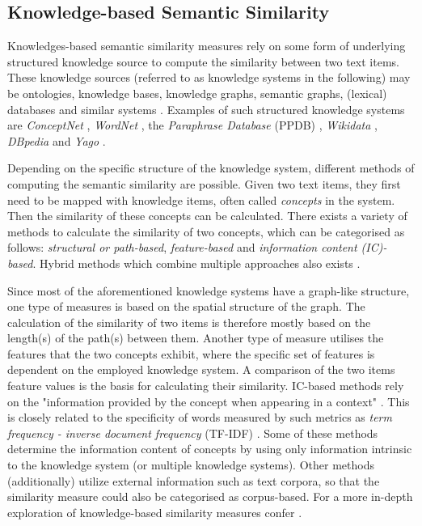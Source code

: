 \documentclass[11pt]{scrreprt}
\let\citef\cite  %
\let\cite\parencite  %
\begin{document}
\subsection{Knowledge-based Semantic Similarity}
Knowledges-based semantic similarity measures rely on some form of underlying structured knowledge source to compute the similarity between two text items. These knowledge sources (referred to as knowledge systems in the following) may be ontologies, knowledge bases, knowledge graphs, semantic graphs, (lexical) databases and similar systems \cite{chandrasekaranEvolutionSemanticSimilarity2021, harispeSemanticSimilarityNatural2015}. Examples of such structured knowledge systems are \textit{ConceptNet} \cite{speerConceptNetOpenMultilingual2017}, \textit{WordNet} \cite{millerWordNetLexicalDatabase1995}, the \textit{Paraphrase Database} (PPDB) \cite{ganitkevitchPPDBParaphraseDatabase2013}, \textit{Wikidata} \cite{vrandecicWikidataFreeCollaborative2014}, \textit{DBpedia} \cite{auerDBpediaNucleusWeb2007} and \textit{Yago} \cite{suchanekYagoCoreSemantic2007}.


Depending on the specific structure of the knowledge system, different methods of computing the semantic similarity are possible. Given two text items, they first need to be mapped with knowledge items, often called \textit{concepts} in the system. Then the similarity of these concepts can be calculated. There exists a variety of methods to calculate the similarity of two concepts, which can be categorised as follows: \textit{structural or path-based}, \textit{feature-based} and \textit{information content (IC)-based}. Hybrid methods which combine multiple approaches also exists \cite{chandrasekaranEvolutionSemanticSimilarity2021, harispeSemanticSimilarityNatural2015}. 


Since most of the aforementioned knowledge systems have a graph-like structure, one type of measures is based on the spatial structure of the graph. The calculation of the similarity of two items is therefore mostly based on the length(s) of the path(s) between them. Another type of measure  utilises the features that the two concepts exhibit, where the specific set of features is dependent on the employed knowledge system. A comparison of the two items feature values is the basis for calculating their similarity. IC-based methods rely on the "information provided by the concept when appearing in a context" \cite{sanchezSemanticSimilarityMethod2013}. This is closely related to the specificity of words measured by such metrics as \textit{term frequency - inverse document frequency} (TF-IDF) \cite{aizawaInformationtheoreticPerspectiveTf2003}. Some of these methods determine the information content of concepts by using only information intrinsic to the knowledge system (or multiple knowledge systems). Other methods (additionally) utilize external information such as text corpora, so that the similarity measure could also be categorised as corpus-based. For a more in-depth exploration of knowledge-based similarity measures confer \citef{chandrasekaranEvolutionSemanticSimilarity2021, harispeSemanticSimilarityNatural2015, zhuComputingSemanticSimilarity2017, mihalceaCorpusbasedKnowledgebasedMeasures2006}.
\end{document}
